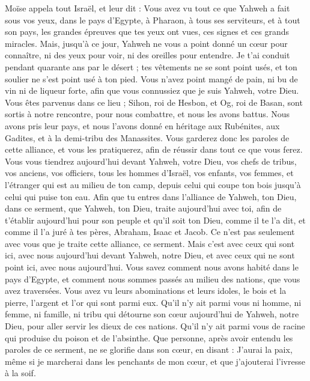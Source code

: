 \begin{multicols}{2}
Moïse appela tout Israël, et leur dit : Vous avez vu tout ce que Yahweh a fait sous vos yeux, dans le pays d'Egypte, à Pharaon, à tous ses serviteurs, et à tout son pays,
les grandes épreuves que tes yeux ont vues, ces signes et ces grands miracles.
Mais, jusqu'à ce jour, Yahweh ne vous a point donné un cœur pour connaître, ni des yeux pour voir, ni des oreilles pour entendre.
Je t’ai conduit pendant quarante ans par le désert ; tes vêtements ne se sont point usés, et ton soulier ne s’est point usé à ton pied.
Vous n'avez point mangé de pain, ni bu de vin ni de liqueur forte, afin que vous connussiez que je suis Yahweh, votre Dieu.
Vous êtes parvenus dans ce lieu ; Sihon, roi de Hesbon, et Og, roi de Basan, sont sortis à notre rencontre, pour nous combattre, et nous les avons battus.
Nous avons pris leur pays, et nous l'avons donné en héritage aux Rubénites, aux Gadites, et à la demi-tribu des Manassites.
Vous garderez donc les paroles de cette alliance, et vous les pratiquerez, afin de réussir dans tout ce que vous ferez.
Vous vous tiendrez aujourd'hui devant Yahweh, votre Dieu, vos chefs de tribus, vos anciens, vos officiers, tous les hommes d'Israël,
vos enfants, vos femmes, et l’étranger qui est au milieu de ton camp, depuis celui qui coupe ton bois jusqu'à celui qui puise ton eau.
Afin que tu entres dans l'alliance de Yahweh, ton Dieu, dans ce serment, que Yahweh, ton Dieu, traite aujourd'hui avec toi,
afin de t’établir aujourd'hui pour son peuple et qu'il soit ton Dieu, comme il te l’a dit, et comme il l’a juré à tes pères, Abraham, Isaac et Jacob.
Ce n'est pas seulement avec vous que je traite cette alliance, ce serment.
Mais c'est avec ceux qui sont ici, avec nous aujourd'hui devant Yahweh, notre Dieu, et avec ceux qui ne sont point ici, avec nous aujourd'hui.
Vous savez comment nous avons habité dans le pays d'Egypte, et comment nous sommes passés au milieu des nations, que vous avez traversées.
Vous avez vu leurs abominations et leurs idoles, le bois et la pierre, l'argent et l'or qui sont parmi eux.
Qu'il n'y ait parmi vous ni homme, ni femme, ni famille, ni tribu qui détourne son cœur aujourd'hui de Yahweh, notre Dieu, pour aller servir les dieux de ces nations. Qu'il n'y ait parmi vous de racine qui produise du poison et de l'absinthe.
Que personne, après avoir entendu les paroles de ce serment, ne se glorifie dans son cœur, en disant : J'aurai la paix, même si je marcherai dans les penchants de mon cœur, et que j’ajouterai l’ivresse à la soif.

\end{multicols}
